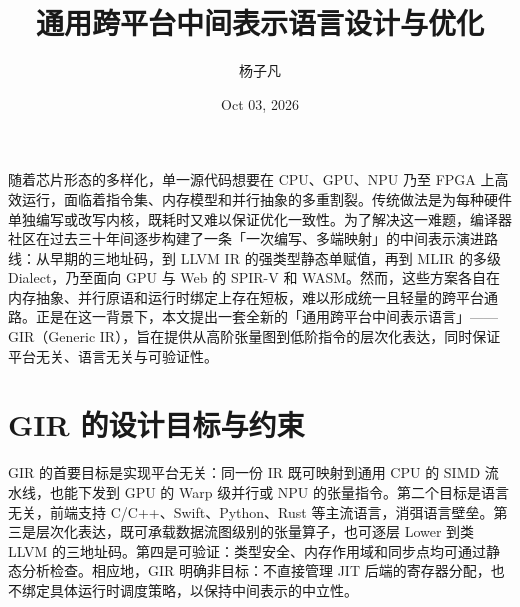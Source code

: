 \title{通用跨平台中间表示语言设计与优化}
\author{杨子凡}
\date{Oct 03, 2026}
\maketitle
随着芯片形态的多样化，单一源代码想要在 CPU、GPU、NPU 乃至 FPGA 上高效运行，面临着指令集、内存模型和并行抽象的多重割裂。传统做法是为每种硬件单独编写或改写内核，既耗时又难以保证优化一致性。为了解决这一难题，编译器社区在过去三十年间逐步构建了一条「一次编写、多端映射」的中间表示演进路线：从早期的三地址码，到 LLVM IR 的强类型静态单赋值，再到 MLIR 的多级 Dialect，乃至面向 GPU 与 Web 的 SPIR-V 和 WASM。然而，这些方案各自在内存抽象、并行原语和运行时绑定上存在短板，难以形成统一且轻量的跨平台通路。正是在这一背景下，本文提出一套全新的「通用跨平台中间表示语言」——GIR（Generic IR），旨在提供从高阶张量图到低阶指令的层次化表达，同时保证平台无关、语言无关与可验证性。\par
\chapter{GIR 的设计目标与约束}
GIR 的首要目标是实现平台无关：同一份 IR 既可映射到通用 CPU 的 SIMD 流水线，也能下发到 GPU 的 Warp 级并行或 NPU 的张量指令。第二个目标是语言无关，前端支持 C/C++、Swift、Python、Rust 等主流语言，消弭语言壁垒。第三是层次化表达，既可承载数据流图级别的张量算子，也可逐层 Lower 到类 LLVM 的三地址码。第四是可验证：类型安全、内存作用域和同步点均可通过静态分析检查。相应地，GIR 明确非目标：不直接管理 JIT 后端的寄存器分配，也不绑定具体运行时调度策略，以保持中间表示的中立性。\par
